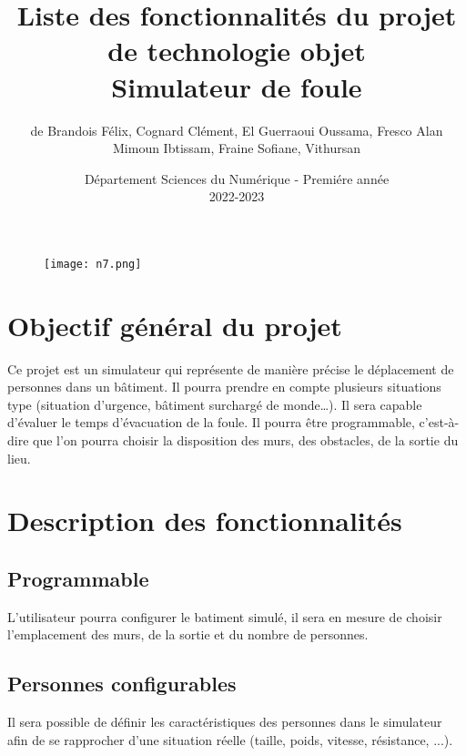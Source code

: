 \documentclass{article}
\begin{document}
\begin{figure}[t]
\centering
\texttt{[image: n7.png]}
\end{figure}

\title{\vspace{4cm} \textbf{Liste des fonctionnalités du projet de technologie objet\\Simulateur de foule}}
\author{de Brandois Félix, Cognard Clément, El Guerraoui Oussama, Fresco Alan\\ Mimoun Ibtissam, Fraine Sofiane, Vithursan\\}
\date{\vspace{7cm} Département Sciences du Numérique - Premiére année \\
2022-2023 }

\maketitle

\newpage
\tableofcontents
\listoffigures

\newpage
\section{Objectif général du projet}
Ce projet est un simulateur qui représente de manière précise le déplacement de personnes dans un bâtiment. Il pourra prendre en compte plusieurs situations type (situation d’urgence, bâtiment surchargé de monde…). Il sera capable d’évaluer le temps d’évacuation de la foule. Il pourra être programmable, c’est-à-dire que l’on pourra choisir la disposition des murs, des obstacles, de la sortie du lieu.

\section{Description des fonctionnalités}
    \subsection{Programmable}
    L'utilisateur pourra configurer le batiment simulé, il sera en mesure de choisir l'emplacement des murs, de la sortie et du nombre de personnes.
    
    \subsection{Personnes configurables}
    Il sera possible de définir les caractéristiques des personnes dans le simulateur afin de se rapprocher d'une situation réelle (taille, poids, vitesse, résistance, ...).
\end{document}
